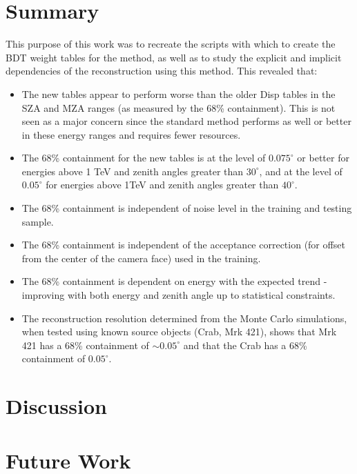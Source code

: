 \documentclass[main.tex]{subfiles}
\begin{document}
\section{Summary}
This purpose of this work was to recreate the scripts with which to create the BDT weight tables for the \disp method, as well as to study the explicit and implicit dependencies of the reconstruction using this method. This revealed that:

\begin{itemize}
\item The new \disp tables appear to perform worse than the older Disp tables in the SZA and MZA ranges (as measured by the 68\% containment). This is not seen as a major concern since the standard method performs as well or better in these energy ranges and requires fewer resources.
\item The 68\% containment for the new \disp tables is at the level of $0.075^\circ$ or better for energies above 1 TeV and zenith angles greater than $30^\circ$, and at the level of $0.05^\circ$ for energies above 1TeV and zenith angles greater than $40^\circ$.
\item The 68\% containment is independent of noise level in the training and testing sample.
\item The 68\% containment is independent of the acceptance correction (for offset from the center of the camera face) used in the training.
\item The 68\% containment is dependent on energy with the expected trend - improving with both energy and zenith angle up to statistical constraints.
\item The reconstruction resolution determined from the Monte Carlo simulations, when tested using known source objects (Crab, Mrk 421), shows that Mrk 421 has a 68\% containment of $\sim 0.05^\circ$ and that the Crab has a 68\% containment of $0.05^\circ$.

\end{itemize}

\section{Discussion}


\section{Future Work}
\end{document}
